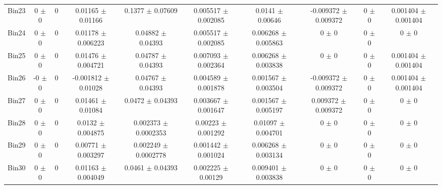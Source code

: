 \begin{tabular}{@{\extracolsep{4pt}}lccccccccc@{}}
     Bin23 & 0 $\pm$ 0 & 0 & 0.01165 $\pm$ 0.01166 & 0.1377 $\pm$ 0.07609 & 0.005517 $\pm$ 0.002085 & 0.0141 $\pm$ 0.00646 & -0.009372 $\pm$ 0.009372 & 0 $\pm$ 0 & 0.001404 $\pm$ 0.001404 \\ 
     Bin24 & 0 $\pm$ 0 & 0 & 0.01178 $\pm$ 0.006223 & 0.04882 $\pm$ 0.04393 & 0.005517 $\pm$ 0.002085 & 0.006268 $\pm$ 0.005863 & 0 $\pm$ 0 & 0 $\pm$ 0 & 0 $\pm$ 0 \\ 
     Bin25 & 0 $\pm$ 0 & 0 & 0.01476 $\pm$ 0.004721 & 0.04787 $\pm$ 0.04393 & 0.007093 $\pm$ 0.002364 & 0.006268 $\pm$ 0.003838 & 0 $\pm$ 0 & 0 $\pm$ 0 & 0.001404 $\pm$ 0.001404 \\ 
     Bin26 & -0 $\pm$ 0 & 0 & -0.001812 $\pm$ 0.01028 & 0.04767 $\pm$ 0.04393 & 0.004589 $\pm$ 0.001878 & 0.001567 $\pm$ 0.003504 & -0.009372 $\pm$ 0.009372 & 0 $\pm$ 0 & 0.001404 $\pm$ 0.001404 \\ 
     Bin27 & 0 $\pm$ 0 & 0 & 0.01461 $\pm$ 0.01084 & 0.0472 $\pm$ 0.04393 & 0.003667 $\pm$ 0.001647 & 0.001567 $\pm$ 0.005197 & 0.009372 $\pm$ 0.009372 & 0 $\pm$ 0 & 0 $\pm$ 0 \\ 
     Bin28 & 0 $\pm$ 0 & 0 & 0.0132 $\pm$ 0.004875 & 0.002373 $\pm$ 0.0002353 & 0.00223 $\pm$ 0.001292 & 0.01097 $\pm$ 0.004701 & 0 $\pm$ 0 & 0 $\pm$ 0 & 0 $\pm$ 0 \\ 
     Bin29 & 0 $\pm$ 0 & 0 & 0.00771 $\pm$ 0.003297 & 0.002249 $\pm$ 0.0002778 & 0.001442 $\pm$ 0.001024 & 0.006268 $\pm$ 0.003134 & 0 $\pm$ 0 & 0 $\pm$ 0 & 0 $\pm$ 0 \\ 
     Bin30 & 0 $\pm$ 0 & 0 & 0.01163 $\pm$ 0.004049 & 0.0461 $\pm$ 0.04393 & 0.002225 $\pm$ 0.00129 & 0.009401 $\pm$ 0.003838 & 0 $\pm$ 0 & 0 $\pm$ 0 & 0 $\pm$ 0 \\ 
\hline\hline
  \end{tabular}
